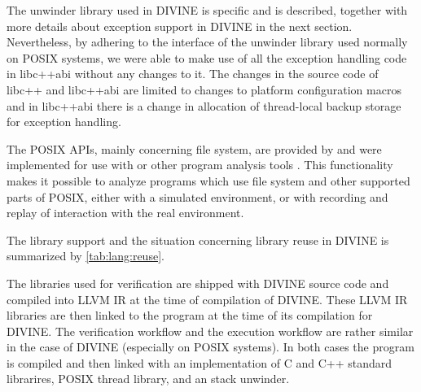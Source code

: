 The unwinder library used in DIVINE is \divm specific and is described,
together with more details about exception support in DIVINE in the next
section.
Nevertheless, by adhering to the interface of the unwinder library used normally
on POSIX systems, we were able to make use of all the exception handling code
in libc++abi without any changes to it.
The changes in the source code of libc++ and libc++abi are limited to changes to platform configuration macros and in libc++abi there is a change in allocation of thread-local backup storage for exception handling.

The POSIX APIs, mainly concerning file system, are provided by \dios and were
implemented for use with \divine or other program analysis tools .
This functionality makes it possible to analyze programs which use file system and other supported parts of POSIX, either with a simulated environment, or with recording and replay of interaction with the real environment.

The library support and the situation concerning library reuse in DIVINE is summarized by \autoref{tab:lang:reuse}.

The libraries used for verification are shipped with DIVINE source code and
compiled into LLVM IR at the time of compilation of DIVINE.
These LLVM IR libraries are then linked to the program at the time of its
compilation for DIVINE.
The verification workflow and the execution workflow are rather similar in the
case of DIVINE (especially on POSIX systems).
In both cases the program is compiled and then linked with an implementation of
C and C++ standard librarires, POSIX thread library, and an stack unwinder.

